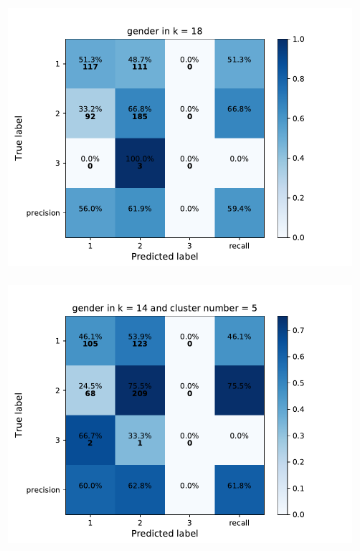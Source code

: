 {\begin{figure}[h]
    \centering
    \begin{subfigure}
      \centering
      \includegraphics[scale=0.45]{fig/super_knn_gender.pdf}
    \end{subfigure}%
    \begin{subfigure}
      \centering
      \includegraphics[scale=0.45]{fig/kms_knn_gender.pdf}
    \end{subfigure}
\end{figure}

}
